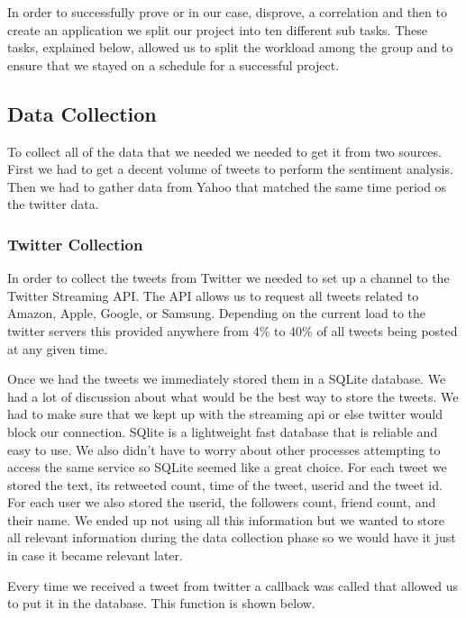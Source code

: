 \documentclass{acm_proc_article-sp}
\begin{document}
In order to successfully prove or in our case, disprove, a correlation and then to create an application
we split our project into ten different sub tasks. These tasks, explained below,
allowed us to split the workload among the group and to ensure that we stayed
on a schedule for a successful project.

\subsection{Data Collection} 

To collect all of the data that we needed we needed to get it from two sources.
First we had to get a decent volume of tweets to perform the sentiment
analysis. Then we had to gather data from Yahoo that matched the same time
period os the twitter data.

\subsubsection{Twitter Collection} 

In order to collect the tweets from Twitter we needed to set up a channel to
the Twitter Streaming API. The API allows us to request all tweets related to
Amazon, Apple, Google, or Samsung. Depending on the current load to the twitter
servers this provided anywhere from 4\% to 40\% of all tweets being posted at
any given time.

Once we had the tweets we immediately stored them in a SQLite database.  We had
a lot of discussion about what would be the best way to store the tweets. We
had to make sure that we kept up with the streaming api or else twitter would
block our connection. SQlite is a lightweight fast database that is reliable
and easy to use. We also didn't have to worry about other processes attempting
to access the same service so SQLite seemed like a great choice. For each tweet
we stored the text, its retweeted count, time of the tweet, userid and the
tweet id. For each user we also stored the userid, the followers count, friend
count, and their name. We ended up not using all this information but we wanted
to store all relevant information during the data collection phase so we would
have it just in case it became relevant later. 

Every time we received a tweet from twitter a callback was called that allowed
us to put it in the database. This function is shown below.

\inputminted{python}{examples/streaming.py}
\end{document}
